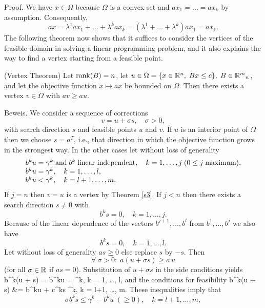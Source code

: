 %
Proof. We have $x \in \Omega$ because $\Omega$ is a convex set and
$ax_1 = \ldots = ax_k$ by assumption. Consequently,
\[
ax = \lambda ^1ax_1 + \ldots + \lambda ^kax_k
= (\lambda ^1 + \ldots + \lambda ^k)ax_1 = ax_1.
\]
%
The following theorem now shows that it suffices to consider the vertices of
the feasible domain in solving a linear programming problem, and it
also explains the way to find a vertex starting from a feasible point.
%
\begin{theorem} \label{s5}
(Vertex Theorem) Let $\rank (B) = n$, let $u \in \Omega = \{x \in \Bbb{R}^n, \;
Bx \leq c\}, \; B \in \Bbb{R}^m{}_n$, and let the objective function $x \mapsto
ax$ be bounded on $\Omega$.  Then there exists a vertex $v \in \Omega$ with $av
\geq au$.
\end{theorem}
%
%
Beweis. We consider a sequence of corrections
\[
v = u + \sigma s, \quad \sigma  > 0,
\]
with search direction $s$ and feasible points
$u$ and $v$. If $u$ is an interior point of
$\Omega$ then we choose $s = a^T$, i.e., that direction in which the
objective function grows in the strongest way. In the other cases let
without loss of generality
\begin{equation} \label{e15}
\ba{.}{ll}
b^ku = \gamma^k \; \mbox{and} \; b^k \; \mbox{linear independent}, \quad
k = 1, \ldots ,j \; ( 0 \leq j \; \mbox{maximum}),\\
b^ku = \gamma^k, \quad k = 1, \ldots ,l,\\
b^ku < \gamma  ^k, \quad k = l+1, \ldots ,m.
\ea{.}
\end{equation}
If $j = n$ then $v = u$ is a vertex by Theorem \ref{s3}.
If $j < n$ then there exists a search direction
$s \neq 0$ with
%
\[
b^ks = 0, \quad k = 1, \dots ,j.
\]
Because of the linear dependence of the vectors $b^{j+1}, \ldots, b^l$ from
$b^1, \ldots, b^j$ we also have
\[
b^ks = 0, \quad k = 1, \ldots, l.
\]
Let without loss of generality $as \geq 0$ else replace $s$
by $-s$. Then
%
\begin{equation} \label{e16}
\forall \: \sigma  > 0: \; a(u + \sigma s) \geq a \, u
\end{equation}
(for all $\sigma  \in \Bbb{R}$ if $as = 0$). Substitution of $u +
\sigma s$ in the side conditions yields
\beqn
b^k(u + \sigma s) = b^ku = \gamma ^k, \; k = 1, \ldots, l,
\eeqn
and the conditions for feasibility
\beqn
b^k(u + \sigma s) &= b^ku + \sigma c^ks \leq \gamma ^k, \; k = l+1, \ldots, m.
\eeqn
These inequalities imply that
%
\begin{equation} \label{e17}
\sigma b^ks \leq \gamma ^k - b^ku \; (\geq 0), \quad k = l+1, \ldots ,m,
\end{equation}

